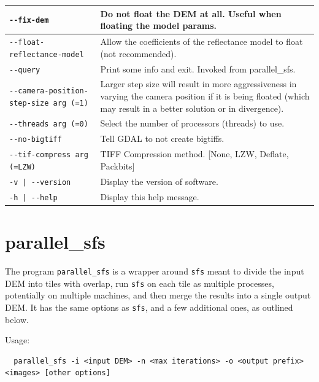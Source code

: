 \begin{longtable}{|l|p{7.5cm}|}
\texttt{-\/-fix-dem} & Do not float the DEM at all. Useful when floating the model params.\\ \hline
\texttt{-\/-float-reflectance-model} & Allow the coefficients of the reflectance model to float (not recommended).\\ \hline
\texttt{-\/-query} & Print some info and exit. Invoked from parallel\_sfs.\\ \hline
\texttt{-\/-camera-position-step-size arg (=1)} & Larger step size will result in more aggressiveness in varying the camera position if it is being floated (which may result in a better solution or in divergence).\\ \hline
\texttt{-\/-threads arg (=0)} & Select the number of processors (threads) to use.\\ \hline
\texttt{-\/-no-bigtiff} & Tell GDAL to not create bigtiffs.\\ \hline
\texttt{-\/-tif-compress arg (=LZW)} & TIFF Compression method. [None, LZW, Deflate, Packbits]\\ \hline
\texttt{-v | -\/-version } & Display the version of software.\\ \hline
\texttt{-h | -\/-help } & Display this help message.\\ \hline
\end{longtable}

\section{parallel\_sfs}
\label{psfs}

The program \texttt{parallel\_sfs} is a wrapper around \texttt{sfs}
meant to divide the input DEM into tiles with overlap, run \texttt{sfs} 
on each tile as multiple processes, potentially on multiple machines,
and then merge the results into a single output DEM. It has the same
options as \texttt{sfs}, and a few additional ones, as outlined below.

Usage:
\begin{verbatim}
  parallel_sfs -i <input DEM> -n <max iterations> -o <output prefix> <images> [other options]
\end{verbatim}

